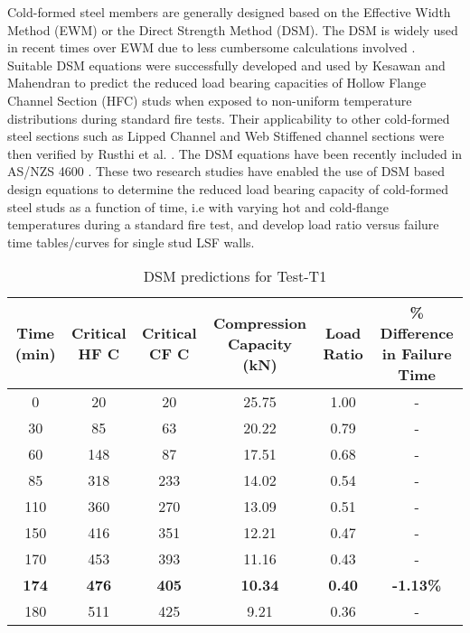 Cold-formed steel members are generally designed based on the Effective Width Method (EWM) or the Direct Strength Method (DSM). The DSM is widely used in recent times over EWM due to less cumbersome calculations involved \citet{Yu2007,Schafer2008b,Shahbazian2011,Shahbazian2012}. 
Suitable DSM equations were successfully developed and used by Kesawan and Mahendran \citet{Kesawan2016} to predict the reduced load bearing capacities of Hollow Flange Channel Section (HFC) studs when exposed to non-uniform temperature distributions during standard fire tests. Their applicability to other cold-formed steel sections such as Lipped Channel and Web Stiffened channel sections were then verified by Rusthi et al. \citet{Rusthi2018}. The DSM equations have been recently included in AS/NZS 4600 \citet{ASNZ4600}. These two research studies \citet{Kesawan2016,Rusthi2018} have enabled the use of DSM based design equations to determine the reduced load bearing capacity of cold-formed steel studs as a function of time, i.e with varying hot and cold-flange temperatures during a standard fire test, and develop load ratio versus failure time tables/curves for single stud LSF walls.

\begin{table}[htbp]
	\centering
	\caption{DSM predictions for Test-T1}
	\begin{tabular}{cccccc}
		\toprule
		\multicolumn{1}{p{2.785em}}{Time (min)} & \multicolumn{1}{p{3.215em}}{Critical HF \degree C} & \multicolumn{1}{p{3.215em}}{Critical CF \degree C} & \multicolumn{1}{p{6em}}{Compression Capacity (kN)} & \multicolumn{1}{p{2.715em}}{Load Ratio} &
		\multirow{2}{7em}{\% Difference in Failure Time} \\
		\midrule
		0    & 20   & 20   & 25.75 & 1.00 & - \\
		30   & 85   & 63   & 20.22 & 0.79 & - \\
		60   & 148  & 87   & 17.51 & 0.68 & - \\
		85   & 318  & 233  & 14.02 & 0.54 & -\\
		110  & 360  & 270  & 13.09 & 0.51 & -\\
		150  & 416  & 351  & 12.21 & 0.47 & -\\
		170  & 453  & 393  & 11.16 & 0.43 & -\\
		\textbf{174}  & \textbf{476}  & \textbf{405}  & \textbf{10.34} &\textbf{ 0.40} & \textbf{-1.13\%}\\
		180  & 511  & 425  & 9.21 & 0.36 & -\\
		\bottomrule
	\end{tabular}%
	\label{tab:DSM-T1}%
\end{table}%

